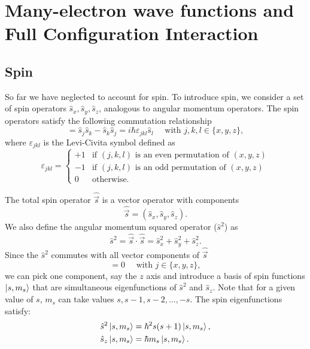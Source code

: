 \documentclass[../Main/chem532-notes.tex]{subfiles}
\begin{document}
\chapter[Many-electron wave functions]{Many-electron wave functions and Full Configuration Interaction}

\section{Spin}
So far we have neglected to account for spin.
To introduce spin, we consider a set of spin operators $\hat{s}_x, \hat{s}_y, \hat{s}_z$, analogous to angular momentum operators.
The spin operators satisfy the following commutation relationship
\begin{equation}
[\hat{s}_{j},\hat{s}_{k}] = \hat{s}_{j}\hat{s}_{k} - \hat{s}_{k}\hat{s}_{j}= i \hbar \varepsilon_{jkl} \hat{s}_{l} \quad \text{ with } j,k,l \in \{x,y,z\},
\end{equation}
where $\varepsilon_{jkl}$ is the Levi-Civita symbol defined as
\begin{equation}
\varepsilon_{jkl} = \begin{cases}
+1 & \text{if $(j,k,l)$ is an even permutation of $(x,y,z)$} \\
-1 & \text{if $(j,k,l)$ is an odd permutation of $(x,y,z)$} \\
0 & \text{otherwise}.
\end{cases}
\end{equation}

The total spin operator $\hat{\vec{s}}$ is a vector operator with components
\begin{equation}
\hat{\vec{s}} = (\hat{s}_x, \hat{s}_y, \hat{s}_z).
\end{equation}
We also define the angular momentum squared operator ($\hat{s}^2$) as
\begin{equation}
\hat{s}^2 = \hat{\vec{s}} \cdot \hat{\vec{s}} = \hat{s}_x^2 + \hat{s}_y^2 + \hat{s}_z^2.
\end{equation}
Since the $\hat{s}^2$ commutes with all vector components of $\hat{\vec{s}}$
\begin{equation}
[\hat{s}^2,\hat{s}_j] = 0 \quad \text{ with } j \in \{x,y,z\},
\end{equation}
we can pick one component, say the $z$ axis and introduce a basis of spin functions $\ket{s,m_s}$ that are simultaneous eigenfunctions of $\hat{s}^2$ and $\hat{s}_z$. Note that for a given value of $s$, $m_s$ can take values $s, s -1, s-2, \ldots, -s$.
The spin eigenfunctions satisfy:
\begin{align}
\hat{s}^2 \ket{s,m_s} &= \hbar^2 s(s+1) \ket{s,m_s}, \\
\hat{s}_z \ket{s,m_s} &= \hbar m_s \ket{s,m_s}.
\end{align}
\end{document}
